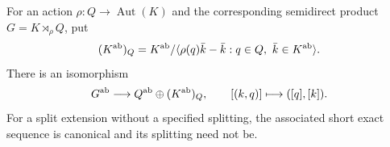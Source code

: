 
\begin{proposition}\label{cdp:st:D.1.1}
For an action $\rho:Q\to\operatorname{Aut}(K)$ and the corresponding
semidirect product $G=K\rtimes_\rho Q$, put
\[
(K^{\rm ab})_Q=K^{\rm ab}/
\langle\rho(q)\bar k-\bar k:q\in Q,\ \bar k\in K^{\rm ab}\rangle.
\]
There is an isomorphism
\[
G^{\rm ab}\longrightarrow Q^{\rm ab}\oplus(K^{\rm ab})_Q,
\qquad [(k,q)]\longmapsto([q],[k]).
\]
For a split extension without a specified splitting, the associated
short exact sequence is canonical and its splitting need not be.
\end{proposition}

